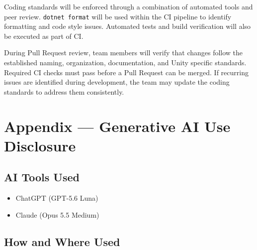\documentclass{article}
\begin{document}
Coding standards will be enforced through a combination of automated tools
and peer review. \texttt{dotnet format} will be used within the CI pipeline
to identify formatting and code style issues. Automated tests and build
verification will also be executed as part of CI.

During Pull Request review, team members will verify that changes follow
the established naming, organization, documentation, and Unity specific
standards. Required CI checks must pass before a Pull Request can be
merged. If recurring issues are identified during development, the team
may update the coding standards to address them consistently.

\newpage{}

\section{Appendix --- Generative AI Use Disclosure}



\subsection{AI Tools Used}


\begin{itemize}
    \item ChatGPT (GPT-5.6 Luna)
    \item Claude (Opus 5.5 Medium)
\end{itemize}

\subsection{How and Where Used}


\end{document}
